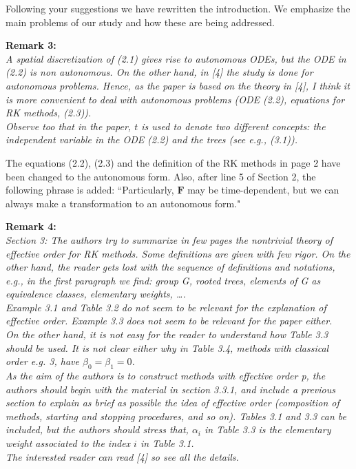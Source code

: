 \documentclass[12pt]{article}
\newcommand{\remark}[2]{\vspace{25pt} \noindent \textbf{Remark #1:\newline} \textit{#2}\vspace{15pt}}
\renewcommand{\newline}{\vspace{15pt}\\}
\begin{document}
Following your suggestions we have rewritten the introduction. 
We emphasize the main problems of our study and how these are being addressed.

\remark{3}{
A spatial discretization of (2.1) gives rise to autonomous ODEs, but the ODE in (2.2) is
non autonomous. 
On the other hand, in [4] the study is done for autonomous problems.
Hence, as the paper is based on the theory in [4], I think it is more convenient to deal
with autonomous problems (ODE (2.2), equations for RK methods, (2.3)).
\newline
Observe too that in the paper, $t$ is used to denote two different concepts: the independent
variable in the ODE (2.2) and the trees (see e.g., (3.1)).}

The equations (2.2), (2.3) and the definition of the RK methods in page 2 have been
changed to the autonomous form. 
Also, after line 5 of Section 2, the following phrase is added:
``Particularly, $\bm{F}$ may be time-dependent, but we can always make a transformation 
to an autonomous form."

\remark{4}{
Section 3: The authors try to summarize in few pages the nontrivial theory of effective
order for RK methods. 
Some definitions are given with few rigor. 
On the other hand, the reader gets lost with the sequence of definitions and notations, 
e.g., in the first paragraph we find: group G, rooted trees, elements of G as equivalence 
classes, elementary weights, \dots.
\newline
Example 3.1 and Table 3.2 do not seem to be relevant for the explanation of effective
order. 
Example 3.3 does not seem to be relevant for the paper either.
\newline
On the other hand, it is not easy for the reader to understand how Table 3.3 should be
used. It is not clear either why in Table 3.4, methods with classical order e.g. 3, have
$\beta_0 = \beta_1 = 0$. \\
As the aim of the authors is to construct methods with effective order p, the authors
should begin with the material in section 3.3.1, and include a previous section to explain
as brief as possible the idea of effective order (composition of methods, starting and
stopping procedures, and so on).
Tables 3.1 and 3.3 can be included, but the authors should stress that, $\alpha_i$ in 
Table 3.3 is the elementary weight associated to the index $i$ in Table 3.1.
\newline
The interested reader can read [4] so see all the details.}
\end{document}
